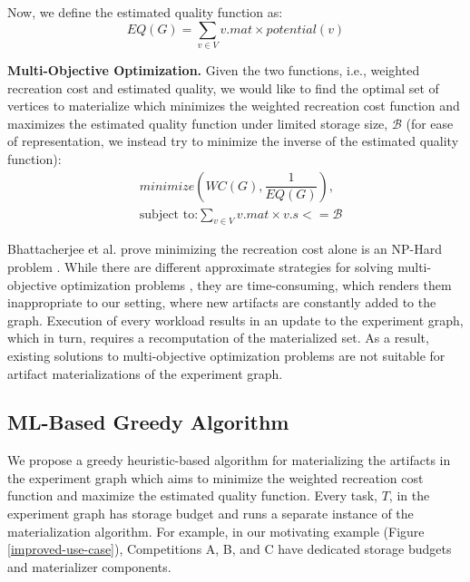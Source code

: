 Now, we define the estimated quality function as:
\[
EQ(G) =  \sum\limits_{v \in V}  v.mat \times potential(v)
\]

\textbf{Multi-Objective Optimization.}
Given the two functions, i.e., weighted recreation cost and estimated quality, we would like to find the optimal set of vertices to materialize which minimizes the weighted recreation cost function and maximizes the estimated quality function under limited storage size, $\mathcal{B}$ (for ease of representation, we instead try to minimize the inverse of the estimated quality function):
\begin{equation}
\begin{split}
& minimize(WC(G), \dfrac{1}{EQ(G)}), \\
& \text{subject to:} \sum\limits_{v \in V} v.mat \times v.s <= \mathcal{B}
\end{split}
\end{equation}

Bhattacherjee et al. prove minimizing the recreation cost alone is an NP-Hard problem \cite{bhattacherjee2015principles}.
While there are different approximate strategies for solving multi-objective optimization problems \cite{coello2007evolutionary}, they are time-consuming, which renders them inappropriate to our setting, where new artifacts are constantly added to the graph.
Execution of every workload results in an update to the experiment graph, which in turn, requires a recomputation of the materialized set.
As a result, existing solutions to multi-objective optimization problems are not suitable for artifact materializations of the experiment graph.

\subsection{ML-Based Greedy Algorithm}\label{subsec-ml-based-materialization}
We propose a greedy heuristic-based algorithm for materializing the artifacts in the experiment graph which aims to minimize the weighted recreation cost function and maximize the estimated quality function.
Every task, $T$, in the experiment graph has storage budget and runs a separate instance of the materialization algorithm.
For example, in our motivating example (Figure \ref{improved-use-case}), Competitions A, B, and C have dedicated storage budgets and materializer components.

